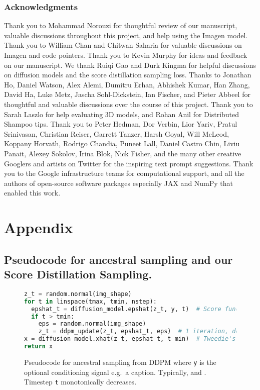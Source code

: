 \documentclass{article} \usepackage{iclr2023_conference,times}
\newcommand{\sname}{Score Distillation Sampling\xspace}
\begin{document}
\subsubsection*{Acknowledgments}
Thank you to Mohammad Norouzi for thoughtful review of our manuscript, valuable discussions throughout this project, and help using the Imagen model. Thank you to William Chan and Chitwan Saharia for valuable discussions on Imagen and code pointers. Thank you to Kevin Murphy for ideas and feedback on our manuscript. We thank Ruiqi Gao and Durk Kingma for helpful discussions on diffusion models and the score distillation sampling loss. Thanks to Jonathan Ho, Daniel Watson, Alex Alemi, Dumitru Erhan, Abhishek Kumar, Han Zhang, David Ha, Luke Metz, Jascha Sohl-Dickstein, Ian Fischer, and Pieter Abbeel for thoughtful and valuable discussions over the course of this project.  Thank you to Sarah Laszlo for help evaluating 3D models, and Rohan Anil for Distributed Shampoo tips. Thank you to Peter Hedman, Dor Verbin, Lior Yariv, Pratul Srinivasan, Christian Reiser, Garrett Tanzer, Harsh Goyal, Will McLeod, Koppany Horvath, Rodrigo Chandia, Puneet Lall, Daniel Castro Chin, Liviu Panait, Alexey Sokolov, Irina Blok, Nick Fisher, and the many other creative Googlers and artists on Twitter for the inspiring text prompt suggestions. Thank you to the Google infrastructure teams for computational support, and all the authors of open-source software packages especially JAX and NumPy that enabled this work.





\clearpage
\appendix
\section{Appendix}

\subsection{Pseudocode for ancestral sampling and our \sname.}

\begin{figure}[h]
\begin{lstlisting}[language=Python]
z_t = random.normal(img_shape)
for t in linspace(tmax, tmin, nstep):
  epshat_t = diffusion_model.epshat(z_t, y, t)  # Score function evaluation.
  if t > tmin:
    eps = random.normal(img_shape)
    z_t = ddpm_update(z_t, epshat_t, eps)  # 1 iteration, decreases noise level.
x = diffusion_model.xhat(z_t, epshat_t, t_min)  # Tweedie's formula: denoise the last step.
return x
\end{lstlisting}
\caption{Pseudocode for ancestral sampling from DDPM where \texttt{y} is the optional conditioning signal e.g.\ a caption. Typically,  and . Timestep \texttt{t} monotonically decreases.}
\label{fig:ancestral_sampling_code}
\end{figure}
\end{document}
